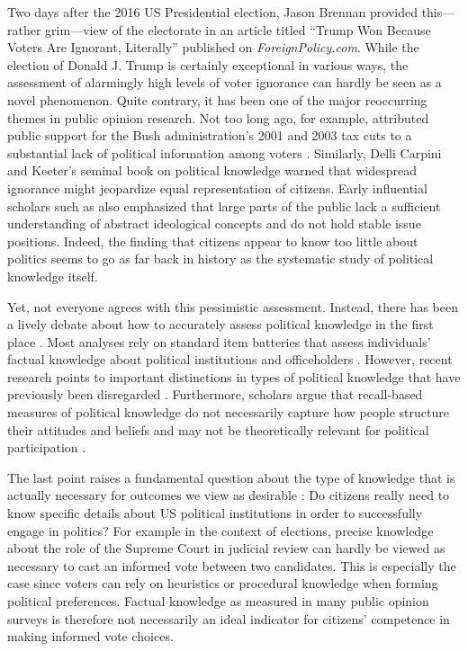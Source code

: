 \documentclass[12pt]{article}
\begin{document}
Two days after the 2016 US Presidential election, Jason Brennan provided this--- rather grim---view of the electorate in an article titled ``Trump Won Because Voters Are Ignorant, Literally'' published on \textit{ForeignPolicy.com}. While the election of Donald J. Trump is certainly exceptional in various ways, the assessment of alarmingly high levels of voter ignorance can hardly be seen as a novel phenomenon. Quite contrary, it has been one of the major reoccurring themes in public opinion research. Not too long ago, for example, \citet{bartels2005homer} attributed public support for the Bush administration's 2001 and 2003 tax cuts to a substantial lack of political information among voters \citep[but see][]{lupia2007were,bartels2007homer}. Similarly, Delli Carpini and Keeter's \citeyearpar{carpini1996americans} seminal book on political knowledge warned that widespread ignorance might jeopardize equal representation of citizens. Early influential scholars such as \citet{converse1964nature} also emphasized that large parts of the public lack a sufficient understanding of abstract ideological concepts and do not hold stable issue positions. Indeed, the finding that citizens appear to know too little about politics seems to go as far back in history as the systematic study of political knowledge itself.

Yet, not everyone agrees with this pessimistic assessment. Instead, there has been a lively debate about how to accurately assess political knowledge in the first place \citep[e.g.][]{mondak2000reconsidering,mondak2001asked,sturgis2008experiment,debell2013harder,pietryka2013analysis}. Most analyses rely on standard item batteries that assess individuals' factual knowledge about political institutions and officeholders \citep[e.g.,][]{carpini1996americans}. However, recent research points to important distinctions in types of political knowledge that have previously been disregarded \citep{barabas2014question}. Furthermore, scholars argue that recall-based measures of political knowledge do not necessarily capture how people structure their attitudes and beliefs \citep[e.g.][]{luskin1987measuring} and may not be theoretically relevant for political participation \citep{lupia2006elitism}.

The last point raises a fundamental question about the type of knowledge that is actually necessary for outcomes we view as desirable \citep[see also][]{lupia2015uninformed}: Do citizens really need to know specific details about US political institutions in order to successfully engage in politics? For example in the context of elections, precise knowledge about the role of the Supreme Court in judicial review can hardly be viewed as necessary to cast an informed vote between two candidates. This is especially the case since voters can rely on heuristics \citep{lupia1994shortcuts} or procedural knowledge \citep{prior2008money} when forming political preferences. Factual knowledge as measured in many public opinion surveys is therefore not necessarily an ideal indicator for citizens' competence in making informed vote choices.
\end{document}
